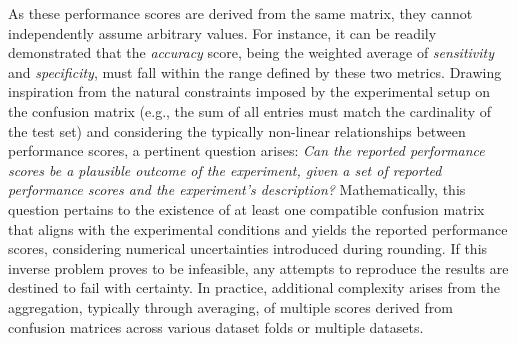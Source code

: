 \documentclass[5p, final]{elsarticle}
\begin{document}
As these performance scores are derived from the same matrix, they cannot independently assume arbitrary values. For instance, it can be readily demonstrated that the \emph{accuracy} score, being the weighted average of \emph{sensitivity} and \emph{specificity}, must fall within the range defined by these two metrics.
Drawing inspiration from the natural constraints imposed by the experimental setup on the confusion matrix (e.g., the sum of all entries must match the cardinality of the test set) and considering the typically non-linear relationships between performance scores, a pertinent question arises: \emph{Can the reported performance scores be a plausible outcome of the experiment, given a set of reported performance scores and the experiment's description?} Mathematically, this question pertains to the existence of at least one compatible confusion matrix that aligns with the experimental conditions and yields the reported performance scores, considering numerical uncertainties introduced during rounding. If this inverse problem proves to be infeasible, any attempts to reproduce the results are destined to fail with certainty. In practice, additional complexity arises from the aggregation, typically through averaging, of multiple scores derived from confusion matrices across various dataset folds or multiple datasets.
\end{document}
